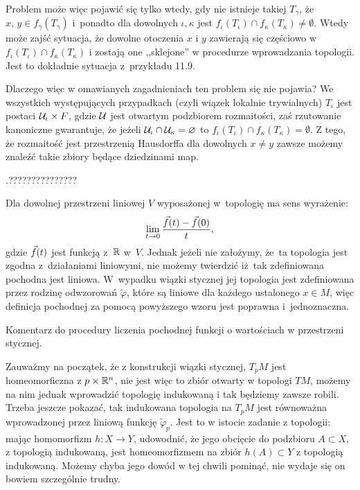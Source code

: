 \documentclass[a4paper,11pt]{article}
\begin{document}
Problem może więc pojawić się tylko wtedy, gdy nie istnieje takiej
$T_{ \gamma }$, że $x, \, y \in f_{ \gamma }( T_{ \gamma } )$
i~ponadto dla dowolnych $\iota, \kappa$ jest
$f_{ \iota } ( T_{ \iota } ) \cap f_{ \kappa } ( T_{ \kappa } ) \neq \emptyset$. Wtedy może zajść sytuacja,
że dowolne otoczenia $x$ i $y$
zawierają się częściowo w
$f_{ \iota } ( T_{ \iota } ) \cap f_{ \kappa } ( T_{ \kappa } )$ i
zostają one ,,sklejone'' w procedurze wprowadzania topologii. Jest to
dokładnie sytuacja z~przykładu 11.9.

Dlaczego więc w omawianych zagadnieniach ten problem się nie
pojawia? We wszystkich występujących przypadkach (czyli wiązek
lokalnie trywialnych) $T_{ \iota }$ jest postaci
$\mathcal{U}_{ \iota } \times F$, gdzie $\mathcal{U}$ jest otwartym
podzbiorem rozmaitości, zaś rzutowanie kanoniczne gwarantuje, że
jeżeli $\mathcal{U}_{ \iota } \cap \mathcal{U}_{ \kappa } = \varnothing$ to
$f_{ \iota } (T_{ \iota }) \cap f_{ \kappa }(T_{ \kappa }) = \emptyset$. Z tego, że rozmaitość jest przestrzenią Hausdorffa dla
dowolnych $x \neq y$ zawsze możemy znaleźć takie zbiory będące
dziedzinami map.

\vspace{\spaceFour}



\start {} .???????????????

\vspace{\spaceFour}



\start {} Dla dowolnej przestrzeni liniowej $V$ wyposażonej
w~topologię ma sens wyrażenie:
\begin{equation}
  \label{eq:GancarzewiczZWGR-s01-02}
  \lim\limits_{ t \to 0 } \frac{ \vec{ f }( t ) - \vec{ f }( 0 ) }{ t },
\end{equation}
gdzie $\vec{ f }( t )$ jest funkcją z~$\mathbb{R}$ w~$V$. Jednak jeżeli
nie założymy, że~ta topologia jest zgodna z~działaniami liniowymi, nie
możemy twierdzić iż~tak zdefiniowana pochodna jest liniowa. W~wypadku
wiązki stycznej jej topologia jest zdefiniowana przez rodzinę
odwzorowań $\widetilde{ \varphi }$, które są liniowe dla każdego
ustalonego $x \in M$, więc definicja pochodnej za pomocą powyższego
wzoru jest poprawna i~jednoznaczna.

\vspace{\spaceFour}



\start Komentarz do procedury liczenia pochodnej funkcji o wartościach
w przestrzeni stycznej.

Zauważmy na początek, że z konstrukcji wiązki stycznej, $T_{ p }M$
jest homeomorficzna z $p \times \mathbb{R}^{ n }$, nie jest więc to
zbiór otwarty w topologi $TM$, możemy na nim jednak wprowadzić
topologię indukowaną i tak będziemy zawsze robili. Trzeba jeszcze
pokazać, tak indukowana topologia na $T_{ p }M$ jest równoważna
wprowadzonej przez liniową funkcję $\widetilde{ \varphi }_{ p }$. Jest
to w istocie zadanie z topologii: mając homomorfizm $h : X \to Y$,
udowodnić, że jego obcięcie do podzbioru $A \subset X$, z topologią indukowaną,
jest homeomorfizmem na zbiór $h( A ) \subset Y$ z topologią indukowaną. Możemy
chyba jego dowód w tej chwili pominąć, nie wydaje się on bowiem
szczególnie trudny.
\end{document}
